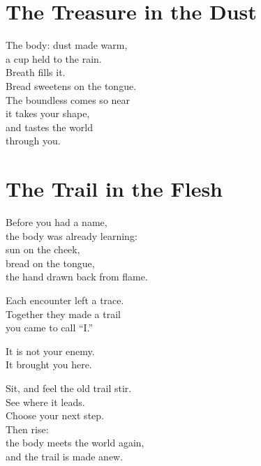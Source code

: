 \documentclass[10pt, openright]{book}
\newcommand{\sectionbreak}{\filbreak}
\newcommand{\sayingsource}[1]{\par\nopagebreak\vspace{0.3\baselineskip}{\raggedleft\footnotesize\itshape #1\par}}
\begin{document}
\sayingsource{Genesis 3:22--24 · Irenaeus, Against Heresies 3.23.6 · Tao
Te Ching 23 · Thomas 56}

\sectionbreak

\section{The Treasure in the Dust}\label{the-treasure-in-the-dust}

The body: dust made warm,\\
a cup held to the rain.\\
Breath fills it.\\
Bread sweetens on the tongue.\\
The boundless comes so near\\
it takes your shape,\\
and tastes the world\\
through you.

\sayingsource{Genesis 2:7 · Thomas 29}

\sectionbreak

\section{The Trail in the Flesh}\label{the-trail-in-the-flesh}

Before you had a name,\\
the body was already learning:\\
sun on the cheek,\\
bread on the tongue,\\
the hand drawn back from flame.

Each encounter left a trace.\\
Together they made a trail\\
you came to call ``I.''

It is not your enemy.\\
It brought you here.

Sit, and feel the old trail stir.\\
See where it leads.\\
Choose your next step.\\
Then rise:\\
the body meets the world again,\\
and the trail is made anew.

\sayingsource{Hymn of the Pearl · Bhagavad Gita 3.27 · Thomas 6}

\sectionbreak
\end{document}
